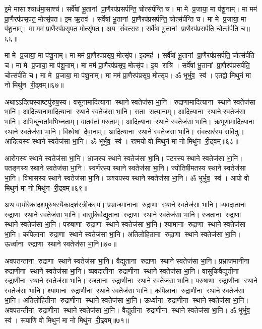 इ॒मे मासाश्चार्धमा॒साश्च॑। सर्वे॑षां भू॒तानां प्रा॒णैरप॑प्रसर्पन्ति॒ चोत्स॑र्पन्ति च। 
मा मे प्र॒जाया॒ मा प॑शू॒नाम्‌। मा मम॑ प्रा॒णैरप॑प्रसृपत॒ मोत्सृ॑पत। 
इ॒म ऋ॒तव॑। सर्वे॑षां भू॒तानां प्रा॒णैरप॑प्रसर्पन्ति॒ चोत्स॑र्पन्ति च। 
मा मे प्र॒जाया॒ मा प॑शू॒नाम्‌। मा मम॑ प्रा॒णैरप॑प्रसृपत॒ मोत्सृ॑पत। 
अ॒य सं॑वत्स॒रः। सर्वे॑षां भू॒तानां प्रा॒णैरप॑प्रसर्पति॒ चोत्स॑र्पति च॥६६॥


मा मे प्र॒जाया॒ मा प॑शू॒नाम्‌। मा मम॑ प्रा॒णैरप॑प्रसृप॒ मोत्सृ॑प। 
इ॒दमह॑। सर्वे॑षां भू॒तानां प्रा॒णैरप॑प्रसर्पति॒ चोत्स॑र्पति च। 
मा मे प्र॒जाया॒ मा प॑शू॒नाम्‌। मा मम॑ प्रा॒णैरप॑प्रसृप॒ मोत्सृ॑प। 
इ॒य रात्रि॑। सर्वे॑षां भू॒तानां प्रा॒णैरप॑प्रसर्पति॒ चोत्स॑र्पति च। 
मा मे प्र॒जाया॒ मा प॑शू॒नाम्‌। मा मम॑ प्रा॒णैरप॑प्रसृप॒ मोत्सृ॑प। 
ॐ भूर्भुव॒ स्व॑। एतद्वो मिथुनं मा नो मिथु॑न री॒ढ्वम्॥६७॥\anuvakamend


अथाऽऽदित्यस्याष्टपु॑रुष॒स्य। 
वसूनामादित्याना स्थाने स्वतेज॑सा भा॒नि। 
रुद्राणामादित्याना स्थाने स्वतेज॑सा भा॒नि। 
आदित्यानामादि\-त्याना स्थाने स्वतेज॑सा भा॒नि। 
सता सत्या॒नाम्‌। आदित्याना स्थाने स्वतेज॑सा भा॒नि। 
अभिधून्वता॑\-मभि॒घ्नताम्‌। वातव॑तां म॒रुताम्‌। 
आदित्याना स्थाने स्वतेज॑सा भा॒नि। 
ऋभूणामादित्याना स्थाने स्वतेज॑सा भा॒नि। 
विश्वेषां देवा॒नाम्‌। आदित्याना स्थाने स्वतेज॑सा भा॒नि। 
संवत्सर॑स्य स॒वितुः। आदित्यस्य स्थाने स्वतेज॑सा भा॒नि। 
ॐ भूर्भुव॒ स्व॑। रश्मयो वो मिथुनं मा नो मिथु॑न री॒ढ्वम्॥६८॥\anuvakamend


आरोगस्य स्थाने स्वतेज॑सा भा॒नि। भ्राजस्य स्थाने स्वतेज॑सा भा॒नि। 
पटरस्य स्थाने स्वतेज॑सा भा॒नि। पतङ्गस्य स्थाने स्वतेज॑सा भा॒नि। 
स्वर्णरस्य स्थाने स्वतेज॑सा भा॒नि। ज्योतिषीमतस्य स्थाने स्वतेज॑सा भा॒नि। 
विभासस्य स्थाने स्वतेज॑सा भा॒नि। कश्यपस्य स्थाने स्वतेज॑सा भा॒नि। 
ॐ भूर्भुव॒ स्व॑। आपो वो मिथुनं मा नो मिथु॑न री॒ढ्वम्॥६९॥\anuvakamend


अथ वायोरेकादशपुरुषस्यैकादश॑स्त्रीक॒स्य। 
प्रभ्राजमानाना रुद्राणा स्थाने स्वतेज॑सा भा॒नि। 
व्यवदाताना रुद्राणा स्थाने स्वतेज॑सा भा॒नि। 
वासुकिवैद्युताना रुद्राणा स्थाने स्वतेज॑सा भा॒नि। 
रजताना रुद्राणा स्थाने स्वतेज॑सा भा॒नि। 
परुषाणा रुद्राणा स्थाने स्वतेज॑सा भा॒नि। 
श्यामाना रुद्राणा स्थाने स्वतेज॑सा भा॒नि। 
कपिलाना रुद्राणा स्थाने स्वतेज॑सा भा॒नि। 
अतिलोहिताना रुद्राणा स्थाने स्वतेज॑सा भा॒नि। 
ऊर्ध्वाना रुद्राणा स्थाने स्वतेज॑सा भा॒नि॥७०॥


अवपतन्ताना रुद्राणा स्थाने स्वतेज॑सा भा॒नि। 
वैद्युताना रुद्राणा स्थाने स्वतेज॑सा भा॒नि। 
प्रभ्राजमानीना रुद्राणीना स्थाने स्वतेज॑सा भा॒नि। 
व्यवदातीना रुद्राणीना स्थाने स्वतेज॑सा भा॒नि। 
वासुकिवैद्युतीना रुद्राणीना स्थाने स्वतेज॑सा भा॒नि। 
रजताना रुद्राणीना स्थाने स्वतेज॑सा भा॒नि। 
परुषाणा रुद्राणीना स्थाने स्वतेज॑सा भा॒नि। 
श्यामाना रुद्राणीना स्थाने स्वतेज॑सा भा॒नि। 
कपिलाना रुद्राणीना स्थाने स्वतेज॑सा भा॒नि। 
अतिलोहितीना रुद्राणीना स्थाने स्वतेज॑सा भा॒नि। 
ऊर्ध्वाना रुद्राणीना स्थाने स्वतेज॑सा भा॒नि। 
अवपतन्तीना रुद्राणीना स्थाने स्वतेज॑सा भा॒नि। 
वैद्युतीना रुद्राणीना स्थाने स्वतेज॑सा भा॒नि। 
ॐ भूर्भुव॒ स्व॑। रूपाणि वो मिथुनं मा नो मिथु॑न री॒ढ्वम्॥७१॥\anuvakamend


